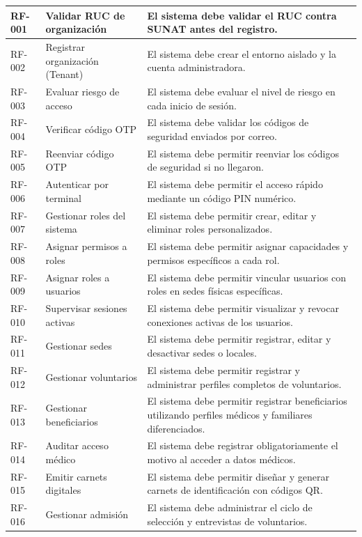 \begin{small}
\begin{longtable}{|p{1.4cm}|p{3.8cm}|p{8.5cm}|}
RF-001 & Validar RUC de organizaci\'on & El sistema debe validar el RUC contra SUNAT antes del registro. \\
\hline
RF-002 & Registrar organizaci\'on (Tenant) & El sistema debe crear el entorno aislado y la cuenta administradora. \\
\hline
RF-003 & Evaluar riesgo de acceso & El sistema debe evaluar el nivel de riesgo en cada inicio de sesi\'on. \\
\hline
RF-004 & Verificar c\'odigo OTP & El sistema debe validar los c\'odigos de seguridad enviados por correo. \\
\hline
RF-005 & Reenviar c\'odigo OTP & El sistema debe permitir reenviar los c\'odigos de seguridad si no llegaron. \\
\hline
RF-006 & Autenticar por terminal & El sistema debe permitir el acceso r\'apido mediante un c\'odigo PIN num\'erico. \\
\hline
RF-007 & Gestionar roles del sistema & El sistema debe permitir crear, editar y eliminar roles personalizados. \\
\hline
RF-008 & Asignar permisos a roles & El sistema debe permitir asignar capacidades y permisos espec\'ificos a cada rol. \\
\hline
RF-009 & Asignar roles a usuarios & El sistema debe permitir vincular usuarios con roles en sedes f\'isicas espec\'ificas. \\
\hline
RF-010 & Supervisar sesiones activas & El sistema debe permitir visualizar y revocar conexiones activas de los usuarios. \\
\hline
RF-011 & Gestionar sedes & El sistema debe permitir registrar, editar y desactivar sedes o locales. \\
\hline
RF-012 & Gestionar voluntarios & El sistema debe permitir registrar y administrar perfiles completos de voluntarios. \\
\hline
RF-013 & Gestionar beneficiarios & El sistema debe permitir registrar beneficiarios utilizando perfiles m\'edicos y familiares diferenciados. \\
\hline
RF-014 & Auditar acceso m\'edico & El sistema debe registrar obligatoriamente el motivo al acceder a datos m\'edicos. \\
\hline
RF-015 & Emitir carnets digitales & El sistema debe permitir dise\~nar y generar carnets de identificaci\'on con c\'odigos QR. \\
\hline
RF-016 & Gestionar admisi\'on & El sistema debe administrar el ciclo de selecci\'on y entrevistas de voluntarios. \\

\end{longtable}
\end{small}
